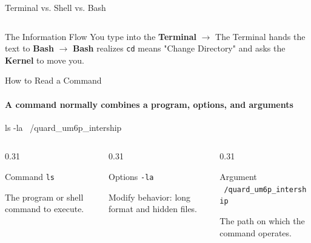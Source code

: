 \begin{frame}{Terminal vs. Shell vs. Bash}
\begin{columns}[T]
\end{columns}

\pause
\vspace{0.3cm}

\begin{alertblock}{The Information Flow}
    You type into the \textbf{Terminal} $\rightarrow$ The Terminal hands the text to \textbf{Bash} $\rightarrow$ \textbf{Bash} realizes \texttt{cd} means "Change Directory" and asks the \textbf{Kernel} to move you.
\end{alertblock}

\end{frame}


\begin{frame}{How to Read a Command}
\framesubtitle{A command normally combines a program, options, and arguments}

\footnotesize

\begin{center}
\colorbox{black!6}{
    \parbox[c][1.00cm][c]{0.88\textwidth}{
        \centering
        \ttfamily
        ls \quad -la \quad ~/quard\_um6p\_intership
    }
}
\end{center}

\vspace{0.15cm}

\begin{columns}[T,onlytextwidth]
    \begin{column}{0.31\textwidth}
        \begin{block}{Command}
            \texttt{ls}

            The program or shell command to execute.
        \end{block}
    \end{column}
    \begin{column}{0.31\textwidth}
        \begin{block}{Options}
            \texttt{-la}

            Modify behavior: long format and hidden files.
        \end{block}
    \end{column}
    \begin{column}{0.31\textwidth}
        \begin{block}{Argument}
            \texttt{~/quard\_um6p\_intership}

            The path on which the command operates.
        \end{block}
    \end{column}
\end{columns}


\end{frame}
